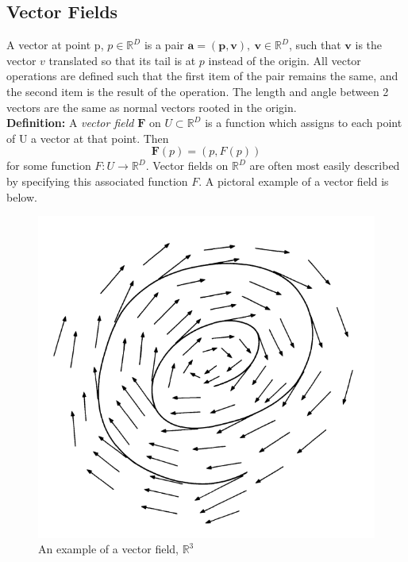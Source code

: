 \documentclass[12pt]{report}
\begin{document}
\subsection{Vector Fields}
A vector at point p, $p \in \mathbb{R}^{D}$ is a pair 
$\textbf{a} = (\textbf{p}, \textbf{v}), \ \textbf{v} \in \mathbb{R}^{D}$, 
such that $\mathbf{v}$ is the vector $v$ translated 
so that its tail is at $p$ instead of the origin. 
All vector operations are defined such that the first item of the pair remains the same, 
and the second item is the result of the operation. 
The length and angle between 2 vectors are the same 
as normal vectors rooted in the origin.\\
\textbf{Definition:} A \textit{vector field} $\textbf{F}$ on 
$U \subset \mathbb{R}^{D}$ is a function which assigns to each point
of U a vector at that point. Then
$$\textbf{F}(p) = (p, F(p))$$ for some function 
$F: U \longrightarrow \mathbb{R}^{D}$. Vector fields on 
$\mathbb{R}^{D}$ are often most easily described by 
specifying this associated function $F$.
A pictoral example of a vector field is below.
\begin{figure}[h]
    \begin{center}
        \includegraphics[scale=0.5]{fig2.5.PNG}
        \caption{An example of a vector field, $\mathbb{R}^3$}
        \label{fig:vectorfield}
    \end{center}
\end{figure}
\end{document}
